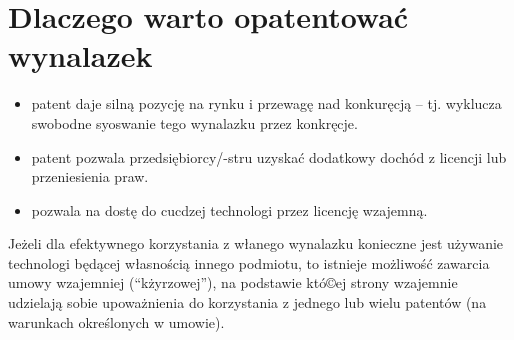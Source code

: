\documentclass[11pt]{article}
\begin{document}
\section{Dlaczego warto opatentować wynalazek}
\label{sec:org61d87e0}
\begin{itemize}
\item patent daje silną pozycję na rynku i przewagę nad konkuręcją -- tj. wyklucza swobodne syoswanie tego wynalazku przez konkręcje.
\item patent pozwala przedsiębiorcy/-stru uzyskać dodatkowy dochód z licencji lub przeniesienia praw.
\item pozwala na dostę do cucdzej technologi przez licencję wzajemną.
\end{itemize}
Jeżeli dla efektywnego korzystania z włanego wynalazku konieczne jest używanie technologi będącej własnością innego podmiotu, to istnieje możliwość zawarcia umowy wzajemniej (``kżyrzowej''), na podstawie któ©ej strony wzajemnie udzielają sobie upoważnienia do korzystania z jednego lub wielu patentów (na warunkach określonych w umowie).
\end{document}
